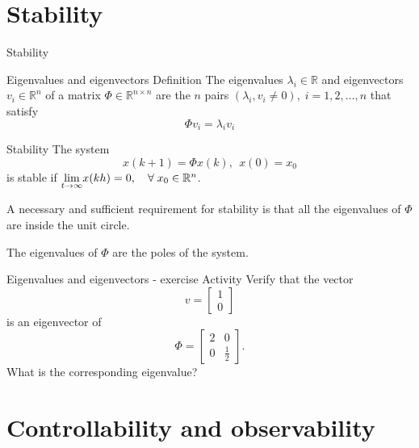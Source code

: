 \documentclass[presentation,aspectratio=1610]{beamer}
\begin{document}
\section{Stability}
\label{sec:orgcffc210}
\begin{frame}[label={sec:org8069c25}]{Stability}
\end{frame}
\begin{frame}[label={sec:org3f34a4d}]{Eigenvalues and eigenvectors}
\alert{Definition} The eigenvalues \(\lambda_i  \in \mathbb{R}\) and eigenvectors \(v_i \in \mathbb{R}^n\) of a matrix \(\Phi \in \mathbb{R}^{n\times{}n}\) are the \(n\) pairs \((\lambda_i, v_i \neq 0 ), \; i=1,2,\ldots,n\) that satisfy
\[ \Phi v_i = \lambda_i v_i \]
\end{frame}

\begin{frame}[label={sec:orga63cfd2}]{Stability}
The system
\begin{equation*}
x(k+1)=\Phi x(k), \ \ x(0)=x_0
\end{equation*}
is \alert{stable} if  \(\underset{t\to\infty}{\lim}x(kh)=0, \quad \forall\;  x_0\in\Bbb{R}^n\).

A necessary and sufficient requirement for stability is that \alert{all the eigenvalues of \(\Phi\) are inside the unit circle.}

The \alert{eigenvalues} of \(\Phi\) are the  \alert{poles} of the system.
\end{frame}

\begin{frame}[label={sec:org38dc8b1}]{Eigenvalues and eigenvectors - exercise}
\alert{Activity} Verify that the vector
\[ v = \begin{bmatrix}1\\0\end{bmatrix}\]
is an eigenvector of
\[ \Phi = \begin{bmatrix} 2 & 0\\0 & \frac{1}{2} \end{bmatrix}. \]
What is the corresponding eigenvalue?
\end{frame}

\section{Controllability and observability}
\label{sec:org41f8fd3}
\end{document}
